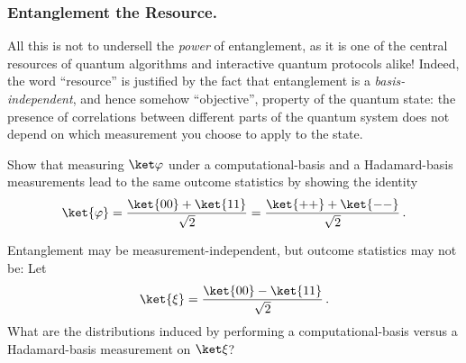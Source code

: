     \subsubsection{Entanglement the Resource.}
    All this is not to undersell the \emph{power} of entanglement, as it is one of
      the central resources of quantum algorithms and interactive quantum
      protocols alike! Indeed, the word ``resource'' is justified by the fact that
      entanglement is a \emph{basis-independent}, and
      hence somehow ``objective'', property of the quantum state: 
      the presence of correlations between different parts of the quantum system
      does not depend on which measurement you choose to apply to the state.

    \begin{exercise}
      \begin{subex}
        \item Show that measuring $\ket\varphi$ 
          under a computational-basis and a Hadamard-basis
          measurements lead to the same outcome statistics by showing the identity
          \[
            \ket{\varphi} = \frac{ \ket{00} + \ket{11} }{\sqrt 2} = 
            \frac{ \ket{++} + \ket{--} }{\sqrt 2}\, .
          \]
        \item Entanglement may be measurement-independent, but outcome
          statistics may not be: Let
          \[
            \ket{\xi} = \frac{ \ket{00} - \ket{11} }{\sqrt 2}\, .
          \]
          What are the distributions induced by performing a computational-basis
          versus a Hadamard-basis measurement on $\ket \xi$?
      \end{subex}
    \end{exercise}

